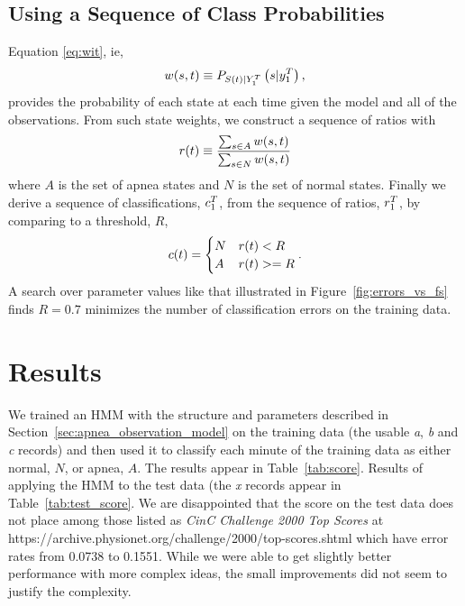 \subsection{Using a Sequence of Class Probabilities}
\label{sec:prettygood}

Equation \eqref{eq:wit}, ie,
\begin{equation*}
  w(s,t) \equiv P_{{S}{(t)}|Y_{1}^{T}} \left(s|y_{1}^{T}
  \right),
\end{equation*}
provides the probability of each state at each time given the model and
all of the observations.  From such state weights, we construct a
sequence of ratios with
\begin{equation*}
  {r}{(t)} \equiv \frac{\sum_{s\in A} w(s,t)}{\sum_{s\in N} w(s,t)}
\end{equation*}
where $A$ is the set of apnea states and $N$ is the set of normal
states.  Finally we derive a sequence of classifications,
$c_{1}^{T}$, from the sequence of ratios, $r_{1}^{T}$, by
comparing to a threshold, $R$,
\begin{equation}
  \label{eq:class_sequence}
  {c}{(t)} =
  \begin{cases}
    N & {r}{(t)} < R \\
    A & {r}{(t)} >= R
  \end{cases}.
\end{equation}
A search over parameter values like that illustrated in
Figure~\ref{fig:errors_vs_fs} finds $R=0.7$ minimizes the number of
classification errors on the training data.

\section{Results}
\label{sec:results}

We trained an HMM with the structure and parameters described in
Section~\ref{sec:apnea_observation_model} on the training data (the
usable \emph{a}, \emph{b} and \emph{c} records) and then used it to
classify each minute of the training data as either normal, $N$, or
apnea, $A$.  The results appear in Table~\ref{tab:score}.  Results of
applying the HMM to the test data (the \emph{x} records appear in
Table~\ref{tab:test_score}.  We are disappointed that the score on the
test data does not place among those listed as \emph{CinC Challenge
  2000 Top Scores} at
https://archive.physionet.org/challenge/2000/top-scores.shtml which
have error rates from 0.0738 to 0.1551.  While we were able to get
slightly better performance with more complex ideas, the small
improvements did not seem to justify the complexity.

